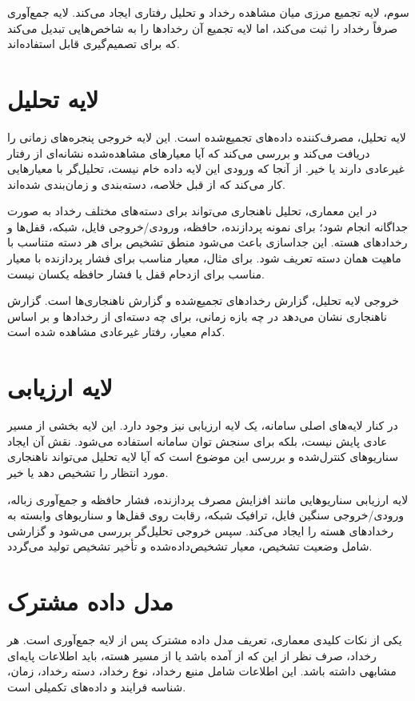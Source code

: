 سوم، لایه تجمیع مرزی میان مشاهده رخداد و تحلیل رفتاری ایجاد می‌کند. لایه جمع‌آوری صرفاً رخداد را ثبت می‌کند، اما لایه تجمیع آن رخدادها را به شاخص‌هایی تبدیل می‌کند که برای تصمیم‌گیری قابل استفاده‌اند.

\section{لایه تحلیل}
لایه تحلیل، مصرف‌کننده داده‌های تجمیع‌شده است. این لایه خروجی پنجره‌های زمانی را دریافت می‌کند و بررسی می‌کند که آیا معیارهای مشاهده‌شده نشانه‌ای از رفتار غیرعادی دارند یا خیر. از آنجا که ورودی این لایه داده خام نیست، تحلیل‌گر با معیارهایی کار می‌کند که از قبل خلاصه، دسته‌بندی و زمان‌بندی شده‌اند.

در این معماری، تحلیل ناهنجاری می‌تواند برای دسته‌های مختلف رخداد به صورت جداگانه انجام شود؛ برای نمونه پردازنده، حافظه، ورودی/خروجی فایل، شبکه، قفل‌ها و رخدادهای هسته. این جداسازی باعث می‌شود منطق تشخیص برای هر دسته متناسب با ماهیت همان دسته تعریف شود. برای مثال، معیار مناسب برای فشار پردازنده با معیار مناسب برای ازدحام قفل یا فشار حافظه یکسان نیست.

خروجی لایه تحلیل، گزارش رخدادهای تجمیع‌شده و گزارش ناهنجاری‌ها است. گزارش ناهنجاری نشان می‌دهد در چه بازه زمانی، برای چه دسته‌ای از رخدادها و بر اساس کدام معیار، رفتار غیرعادی مشاهده شده است.

\section{لایه ارزیابی}
در کنار لایه‌های اصلی سامانه، یک لایه ارزیابی نیز وجود دارد. این لایه بخشی از مسیر عادی پایش نیست، بلکه برای سنجش توان سامانه استفاده می‌شود. نقش آن ایجاد سناریوهای کنترل‌شده و بررسی این موضوع است که آیا لایه تحلیل می‌تواند ناهنجاری مورد انتظار را تشخیص دهد یا خیر.

لایه ارزیابی سناریوهایی مانند افزایش مصرف پردازنده، فشار حافظه و جمع‌آوری زباله، ورودی/خروجی سنگین فایل، ترافیک شبکه، رقابت روی قفل‌ها و سناریوهای وابسته به رخدادهای هسته را ایجاد می‌کند. سپس خروجی تحلیل‌گر بررسی می‌شود و گزارشی شامل وضعیت تشخیص، معیار تشخیص‌داده‌شده و تأخیر تشخیص تولید می‌گردد.

\section{مدل داده مشترک}
یکی از نکات کلیدی معماری، تعریف مدل داده مشترک پس از لایه جمع‌آوری است. هر رخداد، صرف نظر از این که از  آمده باشد یا از مسیر هسته، باید اطلاعات پایه‌ای مشابهی داشته باشد. این اطلاعات شامل منبع رخداد، نوع رخداد، دسته رخداد، زمان، شناسه فرایند و داده‌های تکمیلی است.

